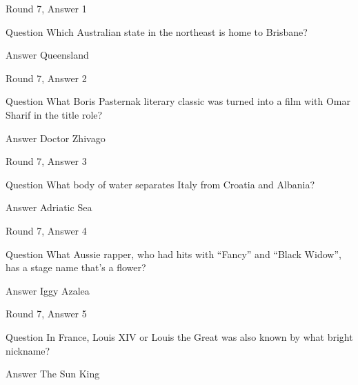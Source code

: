 \documentclass[11pt]{beamer}
\begin{document}
\begin{frame}[t]{Round 7, Answer 1}
\vspace{2em}
\begin{block}{Question}
Which Australian state in the northeast is home to Brisbane\@?
\end{block}
\pause{}
\begin{block}{Answer}
Queensland
\end{block}
\end{frame}
    

\begin{frame}[t]{Round 7, Answer 2}
\vspace{2em}
\begin{block}{Question}
What Boris Pasternak literary classic was turned into a film with Omar Sharif in the title role\@?
\end{block}
\pause{}
\begin{block}{Answer}
Doctor Zhivago
\end{block}
\end{frame}
    

\begin{frame}[t]{Round 7, Answer 3}
\vspace{2em}
\begin{block}{Question}
What body of water separates Italy from Croatia and Albania\@?
\end{block}
\pause{}
\begin{block}{Answer}
Adriatic Sea
\end{block}
\end{frame}
    

\begin{frame}[t]{Round 7, Answer 4}
\vspace{2em}
\begin{block}{Question}
What Aussie rapper, who had hits with ``Fancy'' and ``Black Widow'', has a stage name that's a flower\@?
\end{block}
\pause{}
\begin{block}{Answer}
Iggy Azalea
\end{block}
\end{frame}
    

\begin{frame}[t]{Round 7, Answer 5}
\vspace{2em}
\begin{block}{Question}
In France, Louis XIV or Louis the Great was also known by what bright nickname\@?
\end{block}
\pause{}
\begin{block}{Answer}
The Sun King
\end{block}
\end{frame}
    
\end{document}
